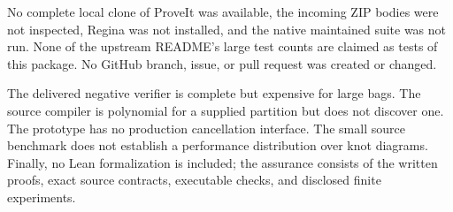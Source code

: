 No complete local clone of ProveIt was available, the incoming ZIP bodies were
not inspected, Regina was not installed, and the native maintained suite was
not run. None of the upstream README's large test counts are claimed as tests
of this package. No GitHub branch, issue, or pull request was created or changed.

The delivered negative verifier is complete but expensive for large bags. The
source compiler is polynomial for a supplied partition but does not discover
one. The prototype has no production cancellation interface. The small source
benchmark does not establish a performance distribution over knot diagrams.
Finally, no Lean formalization is included; the assurance consists of the
written proofs, exact source contracts, executable checks, and disclosed
finite experiments.
